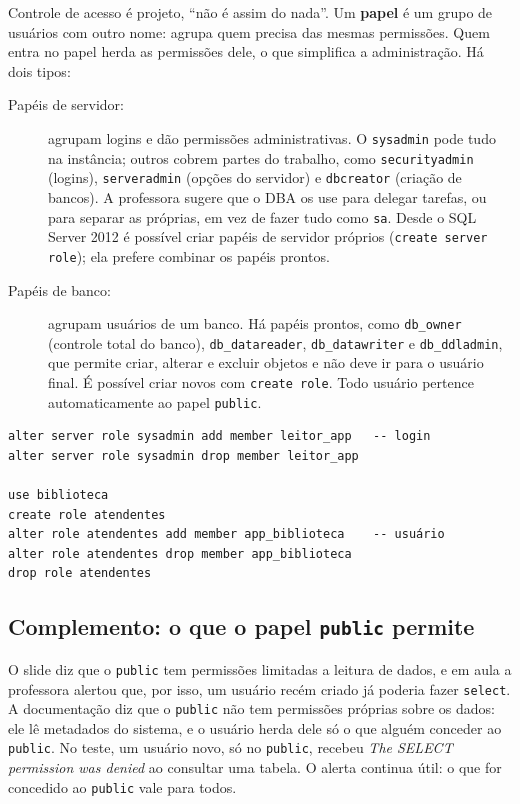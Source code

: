 Controle de acesso é projeto, ``não é assim do nada''. Um
\textbf{papel} é um grupo de usuários com outro nome: agrupa
quem precisa das mesmas permissões.
Quem entra no papel herda as permissões dele, o que simplifica a
administração. Há dois tipos:

\begin{description}
	\item[Papéis de servidor:] agrupam logins e dão permissões
	administrativas. O \texttt{sysadmin} pode tudo na instância; outros
	cobrem partes do trabalho, como \texttt{securityadmin} (logins),
	\texttt{serveradmin} (opções do servidor) e \texttt{dbcreator}
	(criação de bancos). A professora sugere que o DBA os use para delegar
	tarefas, ou para separar as próprias, em vez de fazer tudo como
	\texttt{sa}. Desde o SQL Server 2012 é possível criar papéis de
	servidor próprios (\texttt{create server role}); ela prefere combinar
	os papéis prontos.
	\item[Papéis de banco:] agrupam usuários de um banco. Há papéis
	prontos, como \texttt{db\_owner} (controle total do banco),
	\texttt{db\_datareader}, \texttt{db\_datawriter} e
	\texttt{db\_ddladmin}, que permite criar, alterar e excluir objetos e
	não deve ir para o usuário final. É possível criar novos com
	\texttt{create role}. Todo usuário pertence automaticamente ao papel
	\texttt{public}.
\end{description}

\begin{lstlisting}
alter server role sysadmin add member leitor_app   -- login
alter server role sysadmin drop member leitor_app

use biblioteca
create role atendentes
alter role atendentes add member app_biblioteca    -- usuário
alter role atendentes drop member app_biblioteca
drop role atendentes
\end{lstlisting}

\subsection*{Complemento: o que o papel \texttt{public} permite}

O slide diz que o \texttt{public} tem permissões limitadas a leitura de
dados, e em aula a professora alertou que, por isso, um usuário recém
criado já poderia fazer \texttt{select}. A documentação diz que o
\texttt{public} não tem permissões próprias sobre os dados: ele lê
metadados do sistema, e o usuário herda dele só o que alguém conceder ao
\texttt{public}. No teste, um usuário novo, só no \texttt{public},
recebeu \emph{The SELECT permission was denied} ao consultar uma tabela.
O alerta continua útil: o que for concedido ao \texttt{public} vale para
todos.

